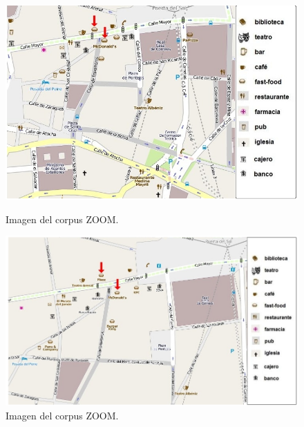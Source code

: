 \begin{figure}
\begin{minipage}[b]{0.48\linewidth}
\centering
\includegraphics[width=\textwidth]{images/corpus/mapa8.png}
\caption{Imagen del corpus ZOOM.}
\label{mapa7}
\end{minipage}
\hspace*{0cm}
\begin{minipage}[b]{0.55\linewidth}
\centering
\includegraphics[width=\textwidth]{images/corpus/mapa18.png}
\caption{Imagen del corpus ZOOM.}
\label{mapa8}
\end{minipage}
\end{figure}


